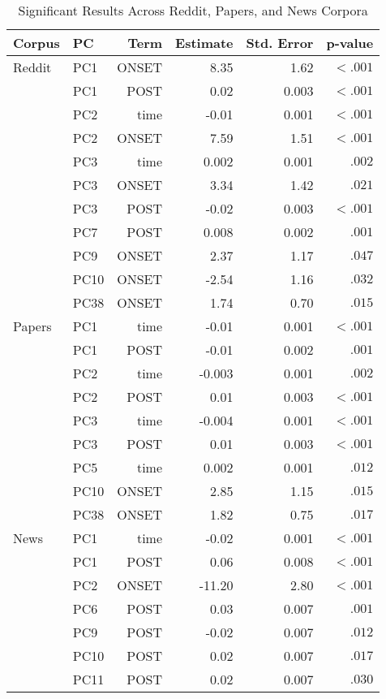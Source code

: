 \begin{table}[ht]
\centering
\caption{Significant Results Across Reddit, Papers, and News Corpora}
\label{tab:significant_results}
\begin{tabular}{llrrrr}
\hline
\textbf{Corpus} & \textbf{PC} & \textbf{Term} & \textbf{Estimate} & \textbf{Std. Error} & \textbf{p-value} \\ \hline
Reddit   & PC1  & ONSET & 8.35   & 1.62  & $< .001$ \\
         & PC1  & POST  & 0.02   & 0.003 & $< .001$ \\
         & PC2  & time  & -0.01  & 0.001 & $< .001$ \\
         & PC2  & ONSET & 7.59   & 1.51  & $< .001$ \\
         & PC3  & time  & 0.002  & 0.001 & $.002$   \\
         & PC3  & ONSET & 3.34   & 1.42  & $.021$   \\
         & PC3  & POST  & -0.02  & 0.003 & $< .001$ \\
         & PC7  & POST  & 0.008  & 0.002 & $.001$   \\
         & PC9  & ONSET & 2.37   & 1.17  & $.047$   \\
         & PC10 & ONSET & -2.54  & 1.16  & $.032$   \\
         & PC38 & ONSET & 1.74   & 0.70  & $.015$   \\
Papers   & PC1  & time  & -0.01  & 0.001 & $< .001$ \\
         & PC1  & POST  & -0.01  & 0.002 & $.001$   \\
         & PC2  & time  & -0.003 & 0.001 & $.002$   \\
         & PC2  & POST  & 0.01   & 0.003 & $< .001$ \\
         & PC3  & time  & -0.004 & 0.001 & $< .001$ \\
         & PC3  & POST  & 0.01   & 0.003 & $< .001$ \\
         & PC5  & time  & 0.002  & 0.001 & $.012$   \\
         & PC10 & ONSET & 2.85   & 1.15  & $.015$   \\
         & PC38 & ONSET & 1.82   & 0.75  & $.017$   \\
News     & PC1  & time  & -0.02  & 0.001 & $< .001$ \\
         & PC1  & POST  & 0.06   & 0.008 & $< .001$ \\
         & PC2  & ONSET & -11.20 & 2.80  & $< .001$ \\
         & PC6  & POST  & 0.03   & 0.007 & $.001$   \\
         & PC9  & POST  & -0.02  & 0.007 & $.012$   \\
         & PC10 & POST  & 0.02   & 0.007 & $.017$   \\
         & PC11 & POST  & 0.02   & 0.007 & $.030$   \\ \hline
\end{tabular}
\end{table}
